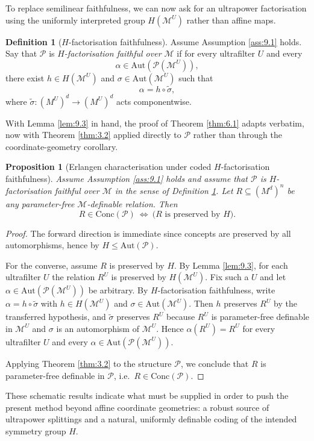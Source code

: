 \documentclass[11pt,a4paper]{article}
\renewcommand{\P}{\mathcal{P}}
\newcommand{\M}{\mathcal{M}}
\newtheorem{proposition}[theorem]{Proposition}
\theoremstyle{definition}
\newtheorem{definition}[theorem]{Definition}
\begin{document}
To replace semilinear faithfulness, we can now ask for an ultrapower
factorisation using the uniformly interpreted group $H(\M^U)$
rather than affine maps.


\begin{definition}[$H$-factorisation faithfulness]
\label{def:9.4}
Assume Assumption \ref{ass:9.1} holds. Say that $\P$ is \emph{$H$-factorisation faithful over $\M$} if
for every ultrafilter $U$ and every \[
\alpha\in \mathrm{Aut}(\P(\M^U)),
\] there exist $h\in H(\M^U)$ and
$\sigma\in \mathrm{Aut}(\M^U)$ such that \[
\alpha=h\circ \widetilde\sigma,
\] where $\widetilde\sigma:(M^U)^d\to(M^U)^d$ acts componentwise.
\end{definition}


With Lemma \ref{lem:9.3} in hand, the proof of Theorem \ref{thm:6.1} adapts verbatim, now
with Theorem \ref{thm:3.2} applied directly to $\P$ rather than through the
coordinate-geometry corollary.


\begin{proposition}[Erlangen characterisation under coded $H$-factorisation faithfulness]
	\label{prop:9.5}
Assume Assumption \ref{ass:9.1} holds and assume that $\P$ is $H$-factorisation faithful over $\M$ in the sense of Definition \ref{def:9.4}. Let $R\subseteq (M^d)^n$ be any
parameter-free $\M$-definable relation. Then \[
R\in \mathrm{Conc}(\P)\ \Longleftrightarrow\ \big(\text{$R$ is preserved by }H\big).
\]
\end{proposition}

\begin{proof}
The forward direction is immediate since concepts are
preserved by all automorphisms, hence by $H\le \mathrm{Aut}(\P)$.

For the converse, assume $R$ is preserved by $H$. By Lemma \ref{lem:9.3}, for
each ultrafilter $U$ the relation $R^U$ is preserved by
$H(\M^U)$. Fix such a $U$ and let
$\alpha\in \mathrm{Aut}(\P(\M^U))$ be arbitrary. By $H$-factorisation faithfulness, write $\alpha=h\circ \widetilde\sigma$ with
$h\in H(\M^U)$ and $\sigma\in \mathrm{Aut}(\M^U)$.
Then $h$ preserves $R^U$ by the transferred hypothesis, and
$\widetilde\sigma$ preserves $R^U$ because $R^U$ is parameter-free
definable in $\M^U$ and $\sigma$ is an automorphism of
$\M^U$. Hence $\alpha(R^U)=R^U$ for every ultrafilter $U$
and every $\alpha\in\mathrm{Aut}(\P(\M^U))$.

Applying Theorem \ref{thm:3.2} to the structure $\P$, we conclude that $R$
is parameter-free definable in $\P$, i.e.~$R\in \mathrm{Conc}(\P)$.
\end{proof}


These schematic results indicate what must be supplied in order to push
the present method beyond affine coordinate geometries: a robust source
of ultrapower splittings and a natural, uniformly definable coding of
the intended symmetry group $H$.




\end{document}
